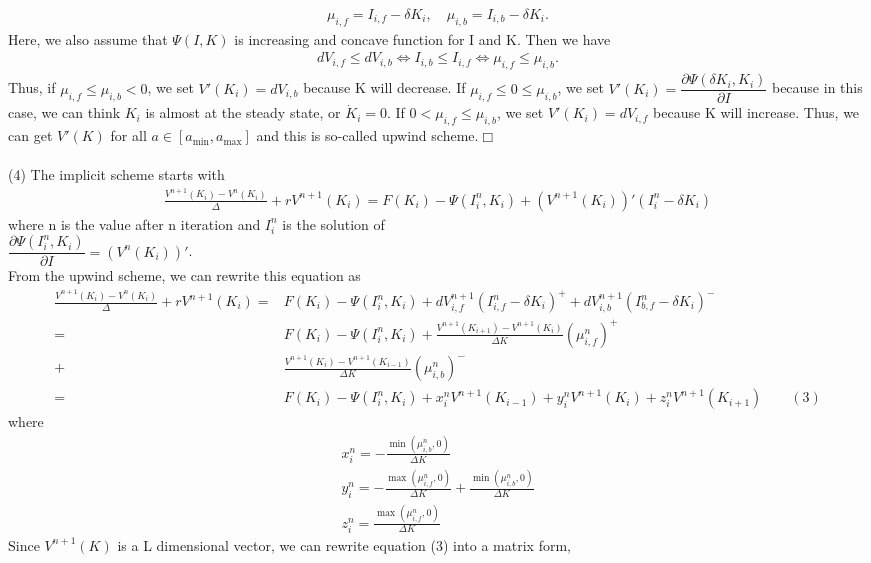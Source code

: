\documentclass{article}
\begin{document}
\begin{CJK}{UTF8}{min}
\begin{align*}
\mu_{i,f}=I_{i,f}-\delta K_i,\quad
\mu_{i,b}=I_{i,b}-\delta K_i.
\end{align*}
Here, we also assume that $\Psi(I,K)$ is increasing and concave function for I and K. Then we have 
\begin{align*}
dV_{i,f}\leq dV_{i,b}\Leftrightarrow I_{i,b}\leq I_{i,f}\Leftrightarrow\mu_{i,f}\leq\mu_{i,b}.
\end{align*}
 Thus, if $\mu_{i,f}\leq\mu_{i,b}<0$, we set $V'(K_i)=dV_{i,b}$ because K will decrease. If $\mu_{i,f}\leq0\leq\mu_{i,b}$, we set
 $V'(K_i)=\dfrac{\partial \Psi(\delta K_i,K_i)}{\partial I}$ because in this case, we can think $K_i$ is almost at the steady state, or $\dot K_i=0$. If $0<\mu_{i,f}\leq\mu_{i,b}$, we set $V'(K_i)=dV_{i,f}$ because K will increase. Thus, we can get $V'(K)$ for all $a\in[a_{\min},a_{\max}]$ and this is so-called upwind scheme.\quad$\Box $\\
\\(4)\quad
The implicit scheme starts with 
\begin{align*}
\frac{V^{n+1}(K_i)-V^n(K_i)}{\Delta }+rV^{n+1}(K_i)=F(K_i)-\Psi(I_i^n,K_i)+(V^{n+1}(K_i))'(I^n_{i}-\delta K_i)
\end{align*}
where n is the value after n iteration and $I_i^n$ is the solution of\\$\dfrac{\partial \Psi(I^n_i,K_i)}{\partial I}=(V^n(K_i))'$.\\
From the upwind scheme, we can rewrite this equation as
\begin{align*}
\frac{V^{n+1}(K_i)-V^n(K_i)}{\Delta }+rV^{n+1}(K_i)=&F(K_i)-\Psi(I_i^n,K_i)+dV_{i,f}^{n+1}(I^n_{i,f}-\delta K_i)^++dV_{i,b}^{n+1}(I^n_{b,f}-\delta K_i)^-\\
=&F(K_i)-\Psi(I_i^n,K_i)+\frac{V^{n+1}(K_{i+1})-V^{n+1}(K_i)}{\Delta K}(\mu_{i,f}^n)^+\\+&\!\frac{V^{n+1}(K_{i})-V^{n+1}(K_{i-1})}{\Delta K}(\mu_{i,b}^n)^-\\
=&F(K_i)-\Psi(I_i^n,K_i)+x_i^nV^{n+1}(K_{i-1})+y_i^nV^{n+1}(K_i)+z_i^nV^{n+1}(K_{i+1})\qquad(3)
\end{align*}
where
\begin{align*}
x_i^n=-\frac{\min(\mu_{i,b}^n,0)}{\Delta K}\\
y_i^n=-\frac{\max(\mu_{i,f}^n,0)}{\Delta K}+\frac{\min(\mu_{i,b}^n,0)}{\Delta K}\\
z_i^n=\frac{\max(\mu_{i,f}^n,0)}{\Delta K}
\end{align*}
Since $V^{n+1}(K)$ is a L dimensional vector, we can rewrite equation (3) into a matrix form,

\end{CJK}
\end{document}
